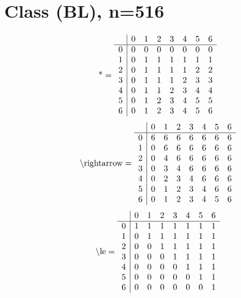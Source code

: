 \documentclass[11pt]{article}
\begin{document}
\section{Class (BL), n=516}
\[\text{*} = 
\begin{array}{r | r r r r r r r}
 & 0 & 1 & 2 & 3 & 4 & 5 & 6 \\ \hline
0 & 0 & 0 & 0 & 0 & 0 & 0 & 0 \\
1 & 0 & 1 & 1 & 1 & 1 & 1 & 1 \\
2 & 0 & 1 & 1 & 1 & 1 & 2 & 2 \\
3 & 0 & 1 & 1 & 1 & 2 & 3 & 3 \\
4 & 0 & 1 & 1 & 2 & 3 & 4 & 4 \\
5 & 0 & 1 & 2 & 3 & 4 & 5 & 5 \\
6 & 0 & 1 & 2 & 3 & 4 & 5 & 6 \\
\end{array}
\]
\[\text{\textbackslash rightarrow} = 
\begin{array}{r | r r r r r r r}
 & 0 & 1 & 2 & 3 & 4 & 5 & 6 \\ \hline
0 & 6 & 6 & 6 & 6 & 6 & 6 & 6 \\
1 & 0 & 6 & 6 & 6 & 6 & 6 & 6 \\
2 & 0 & 4 & 6 & 6 & 6 & 6 & 6 \\
3 & 0 & 3 & 4 & 6 & 6 & 6 & 6 \\
4 & 0 & 2 & 3 & 4 & 6 & 6 & 6 \\
5 & 0 & 1 & 2 & 3 & 4 & 6 & 6 \\
6 & 0 & 1 & 2 & 3 & 4 & 5 & 6 \\
\end{array}
\]
\[\text{\textbackslash le} = 
\begin{array}{r | r r r r r r r}
 & 0 & 1 & 2 & 3 & 4 & 5 & 6 \\ \hline
0 & 1 & 1 & 1 & 1 & 1 & 1 & 1 \\
1 & 0 & 1 & 1 & 1 & 1 & 1 & 1 \\
2 & 0 & 0 & 1 & 1 & 1 & 1 & 1 \\
3 & 0 & 0 & 0 & 1 & 1 & 1 & 1 \\
4 & 0 & 0 & 0 & 0 & 1 & 1 & 1 \\
5 & 0 & 0 & 0 & 0 & 0 & 1 & 1 \\
6 & 0 & 0 & 0 & 0 & 0 & 0 & 1 \\
\end{array}
\]
\end{document}
